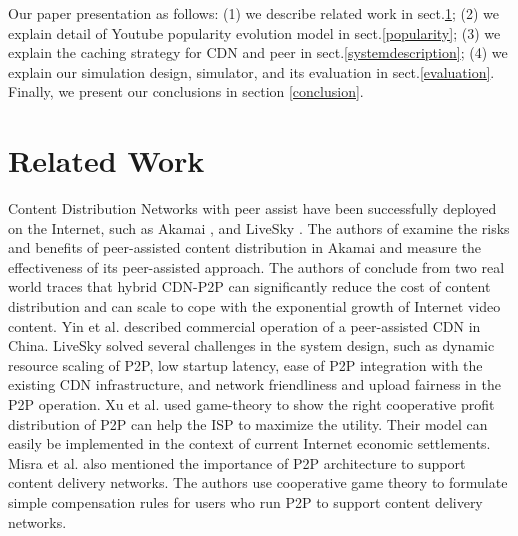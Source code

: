 \documentclass[10pt,final,journal,a4paper]{IEEEtran}
\begin{document}
Our paper presentation as follows: (1) we describe related work in sect.\ref{relatedwork}; (2) we explain detail of Youtube popularity evolution model in sect.\ref{popularity}; (3) we explain the caching strategy for CDN and peer in sect.\ref{systemdescription}; (4) we explain our simulation design, simulator, and its evaluation in sect.\ref{evaluation}.
Finally, we present our conclusions in section \ref{conclusion}.

\section{Related Work}\label{relatedwork}
Content Distribution Networks with peer assist have been successfully deployed on the Internet, such as Akamai \cite{Zhao:2013:PCD:2504730.2504752}, \cite{Huang:2008:UHC:1496046.1496064} and LiveSky \cite{Yin:2010:LEC:1823746.1823750}.  
The authors of \cite{Zhao:2013:PCD:2504730.2504752} examine the risks and benefits of peer-assisted content distribution in Akamai and measure the effectiveness of its peer-assisted approach. 
The authors of \cite{Huang:2008:UHC:1496046.1496064} conclude from two real world traces that hybrid CDN-P2P can significantly reduce the cost of content distribution and can scale to cope with the exponential growth of Internet video content.  
Yin et al. \cite{Yin:2010:LEC:1823746.1823750} described commercial operation of a peer-assisted CDN in China.  
LiveSky solved several challenges in the system design, such as dynamic resource scaling of P2P, low startup latency, ease of P2P integration with the existing CDN infrastructure, and network friendliness and upload fairness in the P2P operation.  
Xu et al.\cite{DBLP:journals/corr/abs-1212-4915} used game-theory to show the right cooperative profit distribution of P2P can help the ISP to maximize the utility.  
Their model can easily be implemented in the context of current Internet economic settlements.  
Misra et al.\cite{Misra:2010:IPS:1811099.1811064} also mentioned the importance of P2P architecture to support content delivery networks.
The authors use cooperative game theory to formulate simple compensation rules for users who run P2P to support content delivery networks.
\end{document}
